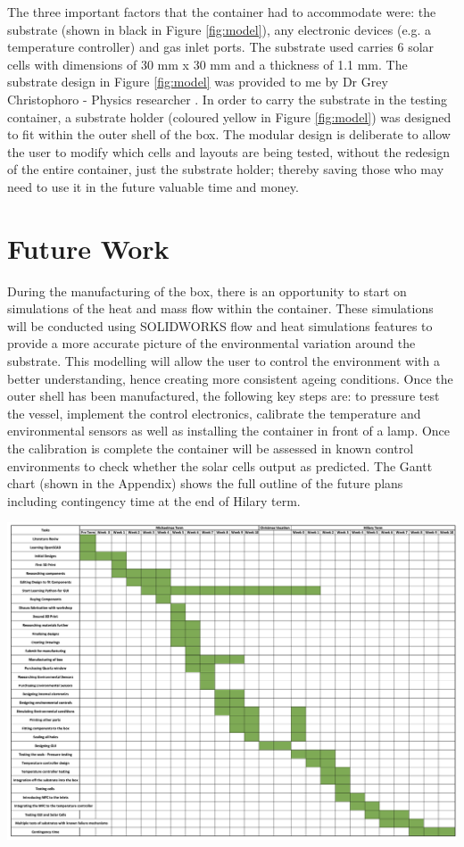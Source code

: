 \documentclass[a4paper,11pt]{article}
\begin{document}
\noindent The three important factors that the container had to accommodate were: the substrate (shown in black in Figure \ref{fig:model}), any electronic devices (e.g. a temperature controller)  and gas inlet ports. The substrate used carries 6 solar cells with dimensions of 30 mm x 30 mm and a thickness of 1.1 mm. The substrate design in Figure \ref{fig:model} was provided to me by Dr Grey Christophoro - Physics researcher \cite{RN48}. In order to carry the substrate in the testing container, a substrate holder (coloured yellow in Figure \ref{fig:model}) was designed to fit within the outer shell of the box. The modular design is deliberate to allow the user to modify which cells and layouts are being tested, without the redesign of the entire container, just the substrate holder; thereby saving those who may need to use it in the future valuable time and money. 
\section{Future Work}
During the manufacturing of the box, there is an opportunity to start on simulations of the heat and mass flow within the container. These simulations will be conducted using SOLIDWORKS flow and heat simulations features to provide a more accurate picture of the environmental variation around the substrate. This modelling will allow the user to control the environment with a better understanding, hence creating more consistent ageing conditions. Once the outer shell has been manufactured, the following key steps are: to pressure test the vessel, implement the control electronics, calibrate the temperature and environmental sensors as well as installing the container in front of a lamp. Once the calibration is complete the container will be assessed in known control environments to check whether the solar cells output as predicted. The Gantt chart (shown in the Appendix) shows the full outline of the future plans including contingency time at the end of Hilary term. 
\begin{singlespace}

\end{singlespace}

\appendix
\appendixpage
\begin{appendix}
\includegraphics[width=1.4\linewidth, angle=270]{gantt}
\end{appendix}
\end{document}
